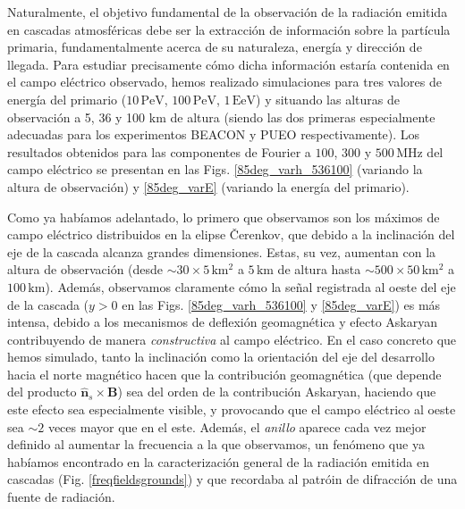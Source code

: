 \documentclass[11 pt, a4paper]{article} %
\numberwithin{equation}{section}
\numberwithin{figure}{section}
\numberwithin{table}{section}
\newcommand{\vect}[1]{\boldsymbol{\mathbf{#1}}}
\begin{document}
Naturalmente, el objetivo fundamental de la observación de la radiación emitida en cascadas atmosféricas debe ser la extracción de información sobre la partícula primaria, fundamentalmente acerca de su naturaleza, energía y dirección de llegada. Para estudiar precisamente cómo dicha información estaría contenida en el campo eléctrico observado, hemos realizado simulaciones para tres valores de energía del primario ($10\,\mathrm{PeV}$, $100\,\mathrm{PeV}$, $1\,\mathrm{EeV}$) y situando las alturas de observación a 5, 36 y 100 $\mathrm{km}$ de altura (siendo las dos primeras especialmente adecuadas para los experimentos BEACON y PUEO respectivamente). Los resultados obtenidos para las componentes de Fourier a $100$, $300$ y $500\,\mathrm{MHz}$ del campo eléctrico se presentan en las Figs. \ref{85deg_varh_536100} (variando la altura de observación)  y \ref{85deg_varE} (variando la energía del primario).

Como ya habíamos adelantado, lo primero que observamos son los máximos de campo eléctrico distribuidos en la elipse \v{C}erenkov, que debido a la inclinación del eje de la cascada alcanza grandes dimensiones. Estas, su vez, aumentan con la altura de observación (desde $\sim30\times5\,\mathrm{km^2}$ a $5\,\mathrm{km}$ de altura hasta $\sim500\times50\,\mathrm{km^2}$ a $100\,\mathrm{km}$). Además, observamos claramente cómo la señal registrada al oeste del eje de la cascada ($y>0$ en las Figs. \ref{85deg_varh_536100} y \ref{85deg_varE}) es más intensa, debido a los mecanismos de deflexión geomagnética y efecto Askaryan contribuyendo de manera \textit{constructiva} al campo eléctrico. En el caso concreto que hemos simulado, tanto la inclinación como la orientación del eje del desarrollo hacia el norte magnético hacen que la contribución geomagnética (que depende del producto $\hat{\vect{n}}_s\times\vect{B}$) sea del orden de la contribución Askaryan, haciendo que este efecto sea especialmente visible, y provocando que el campo eléctrico al oeste sea $\sim2$ veces mayor que en el este. Además, el \textit{anillo} aparece cada vez mejor definido al aumentar la frecuencia a la que observamos, un fenómeno que ya habíamos encontrado en la caracterización general de la radiación emitida en cascadas (Fig. \ref{freqfieldsgrounds}) y que recordaba al patróin de difracción de una fuente de radiación.
\end{document}
